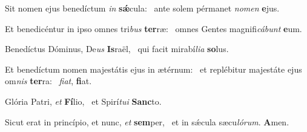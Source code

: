 \item Sit nomen ejus benedíctum \textit{in} \textbf{sǽ}cula:~\psstar{} ante solem pérmanet \textit{nomen} \textbf{e}jus.
\item Et benedicéntur in ipso omnes tri\textit{bus} \textbf{ter}ræ:~\psstar{} omnes Gentes magnifi\textit{cábunt} \textbf{e}um.
\item Benedíctus Dóminus, De\textit{us} \textbf{Is}raël,~\psstar{} qui facit mirabí\textit{lia} \textbf{so}lus.
\item Et benedíctum nomen majestátis ejus in ætérnum:~\pscross{} et replébitur majestáte ejus om\textit{nis} \textbf{ter}ra:~\psstar{} \textit{fiat}, \textbf{fi}at.
\item Glória Patri, \textit{et} \textbf{Fí}lio,~\psstar{} et Spirí\textit{tui} \textbf{Sanc}to.
\item Sicut erat in princípio, et nunc, \textit{et} \textbf{sem}per,~\psstar{} et in sǽcula sæcu\textit{lórum}. \textbf{A}men.